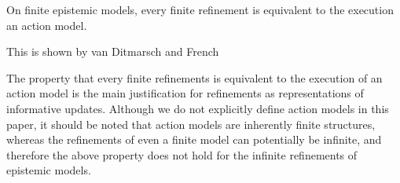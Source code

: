 \begin{proposition}
On finite epistemic models, every finite refinement is equivalent to the
execution an action model.
\end{proposition}

This is shown by van Ditmarsch and French~\cite{french2009simulation}

The property that every finite refinements is equivalent to the execution of an
action model is the main justification for refinements as representations of
informative updates. Although we do not explicitly define action models in this
paper, it should be noted that action models are inherently finite structures,
whereas the refinements of even a finite model can potentially be infinite, and
therefore the above property does not hold for the infinite refinements of
epistemic models.
